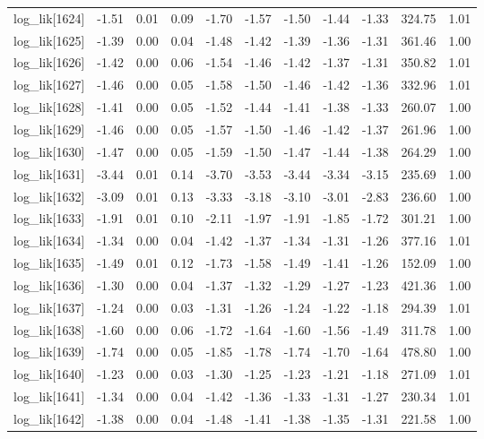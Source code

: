 \begin{table}[ht]
\begin{tabular}{rrrrrrrrrrr}
  log\_lik[1624] & -1.51 & 0.01 & 0.09 & -1.70 & -1.57 & -1.50 & -1.44 & -1.33 & 324.75 & 1.01 \\ 
  log\_lik[1625] & -1.39 & 0.00 & 0.04 & -1.48 & -1.42 & -1.39 & -1.36 & -1.31 & 361.46 & 1.00 \\ 
  log\_lik[1626] & -1.42 & 0.00 & 0.06 & -1.54 & -1.46 & -1.42 & -1.37 & -1.31 & 350.82 & 1.01 \\ 
  log\_lik[1627] & -1.46 & 0.00 & 0.05 & -1.58 & -1.50 & -1.46 & -1.42 & -1.36 & 332.96 & 1.01 \\ 
  log\_lik[1628] & -1.41 & 0.00 & 0.05 & -1.52 & -1.44 & -1.41 & -1.38 & -1.33 & 260.07 & 1.00 \\ 
  log\_lik[1629] & -1.46 & 0.00 & 0.05 & -1.57 & -1.50 & -1.46 & -1.42 & -1.37 & 261.96 & 1.00 \\ 
  log\_lik[1630] & -1.47 & 0.00 & 0.05 & -1.59 & -1.50 & -1.47 & -1.44 & -1.38 & 264.29 & 1.00 \\ 
  log\_lik[1631] & -3.44 & 0.01 & 0.14 & -3.70 & -3.53 & -3.44 & -3.34 & -3.15 & 235.69 & 1.00 \\ 
  log\_lik[1632] & -3.09 & 0.01 & 0.13 & -3.33 & -3.18 & -3.10 & -3.01 & -2.83 & 236.60 & 1.00 \\ 
  log\_lik[1633] & -1.91 & 0.01 & 0.10 & -2.11 & -1.97 & -1.91 & -1.85 & -1.72 & 301.21 & 1.00 \\ 
  log\_lik[1634] & -1.34 & 0.00 & 0.04 & -1.42 & -1.37 & -1.34 & -1.31 & -1.26 & 377.16 & 1.01 \\ 
  log\_lik[1635] & -1.49 & 0.01 & 0.12 & -1.73 & -1.58 & -1.49 & -1.41 & -1.26 & 152.09 & 1.00 \\ 
  log\_lik[1636] & -1.30 & 0.00 & 0.04 & -1.37 & -1.32 & -1.29 & -1.27 & -1.23 & 421.36 & 1.00 \\ 
  log\_lik[1637] & -1.24 & 0.00 & 0.03 & -1.31 & -1.26 & -1.24 & -1.22 & -1.18 & 294.39 & 1.01 \\ 
  log\_lik[1638] & -1.60 & 0.00 & 0.06 & -1.72 & -1.64 & -1.60 & -1.56 & -1.49 & 311.78 & 1.00 \\ 
  log\_lik[1639] & -1.74 & 0.00 & 0.05 & -1.85 & -1.78 & -1.74 & -1.70 & -1.64 & 478.80 & 1.00 \\ 
  log\_lik[1640] & -1.23 & 0.00 & 0.03 & -1.30 & -1.25 & -1.23 & -1.21 & -1.18 & 271.09 & 1.01 \\ 
  log\_lik[1641] & -1.34 & 0.00 & 0.04 & -1.42 & -1.36 & -1.33 & -1.31 & -1.27 & 230.34 & 1.01 \\ 
  log\_lik[1642] & -1.38 & 0.00 & 0.04 & -1.48 & -1.41 & -1.38 & -1.35 & -1.31 & 221.58 & 1.00 \\ 

\end{tabular}
\end{table}
